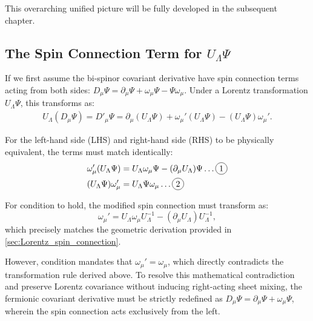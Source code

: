 This overarching unified picture will be fully developed in the subsequent chapter.

\begin{subappendices}

\section{The Spin Connection Term for $U_\Lambda\Psi$} \label{sec:Lorentz_spin_connec_fermions}

If we first assume the bi-spinor covariant derivative have spin connection terms acting from both sides: $D_\mu\Psi=\partial_\mu\Psi +\omega_\mu\Psi-\Psi\omega_\mu$. 
Under a Lorentz transformation $U_\Lambda\Psi$, this transforms as:
\begin{equation}
\begin{aligned}
U_\Lambda(D_\mu\Psi)=D'_\mu\Psi=\partial_\mu(U_\Lambda\Psi)+\omega_\mu'(U_\Lambda\Psi)-(U_\Lambda\Psi)\omega_\mu'.
\end{aligned}
\end{equation}

For the left-hand side (LHS) and right-hand side (RHS) to be physically equivalent, the terms must match identically:
\begin{equation}
\begin{aligned}
    \omega_\mu'(U_\Lambda \Psi )&=U_\Lambda \omega_\mu\Psi -(\partial_\mu U_\Lambda) \Psi \dots\circled{1}\\
    (U_\Lambda \Psi )\omega_\mu'&=U_\Lambda \Psi\omega_\mu \dots\circled{2}
\end{aligned}
\end{equation}

For condition  to hold, the modified spin connection must transform as:
\begin{equation}
  \omega_{\mu}'= U_{\Lambda}\omega_{\mu} U_{\Lambda}^{-1}-(\partial_{\mu}U_{\Lambda})U_{\Lambda}^{-1},
\end{equation}
which precisely matches the geometric derivation provided in \cref{sec:Lorentz_spin_connection}.

However, condition  mandates that $\omega_{\mu}'=\omega_{\mu}$, which directly contradicts the transformation rule derived above. To resolve this mathematical contradiction and preserve Lorentz covariance without inducing right-acting sheet mixing, the fermionic covariant derivative must be strictly redefined as $D_\mu\Psi=\partial_\mu\Psi +\omega_\mu\Psi$, wherein the spin connection acts exclusively from the left.


\end{subappendices}

\printbibliography[heading=subbibintoc, title={References for Chapter \thechapter}]